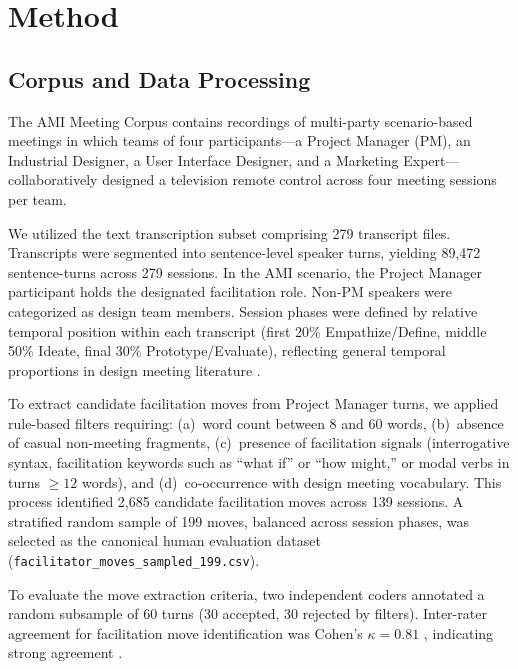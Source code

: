 \documentclass[preprint,12pt,authoryear]{elsarticle}
\begin{document}
\section{Method}

\subsection{Corpus and Data Processing}

The AMI Meeting Corpus \citep{carletta2005ami} contains recordings of multi-party scenario-based meetings in which teams of four participants---a Project Manager (PM), an Industrial Designer, a User Interface Designer, and a Marketing Expert---collaboratively designed a television remote control across four meeting sessions per team.

We utilized the text transcription subset comprising 279 transcript files. Transcripts were segmented into sentence-level speaker turns, yielding 89,472 sentence-turns across 279 sessions. In the AMI scenario, the Project Manager participant holds the designated facilitation role. Non-PM speakers were categorized as design team members. Session phases were defined by relative temporal position within each transcript (first 20\% Empathize/Define, middle 50\% Ideate, final 30\% Prototype/Evaluate), reflecting general temporal proportions in design meeting literature \citep{seidel2013}.

To extract candidate facilitation moves from Project Manager turns, we applied rule-based filters requiring: (a)~word count between 8 and 60 words, (b)~absence of casual non-meeting fragments, (c)~presence of facilitation signals (interrogative syntax, facilitation keywords such as ``what if'' or ``how might,'' or modal verbs in turns $\ge 12$ words), and (d)~co-occurrence with design meeting vocabulary. This process identified 2,685 candidate facilitation moves across 139 sessions. A stratified random sample of 199 moves, balanced across session phases, was selected as the canonical human evaluation dataset (\texttt{facilitator\_moves\_sampled\_199.csv}).

To evaluate the move extraction criteria, two independent coders annotated a random subsample of 60 turns (30 accepted, 30 rejected by filters). Inter-rater agreement for facilitation move identification was Cohen's $\kappa = 0.81$ \citep{cohen1960coefficient}, indicating strong agreement \citep{landis1977measurement}.
\end{document}
